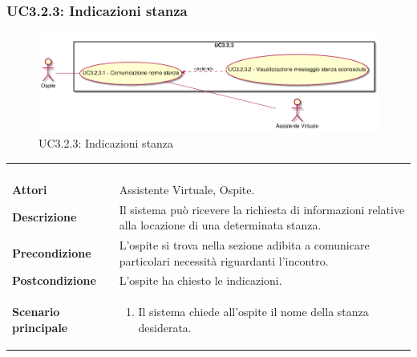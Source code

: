 \newpage\subsubsection{UC3.2.3: Indicazioni stanza}
\label{UC3.2.3}
\begin{figure}[h]
	\centering
	\includegraphics[width=\textwidth,height=\textheight,keepaspectratio]{images/UseCaseUC323.png}
	\caption{UC3.2.3: Indicazioni stanza}
\end{figure}
\begin{longtable}{l|p{10cm}}
	\rowcolor[gray]{0.8} \multicolumn{2}{c}{} \\
	\rowcolor[gray]{0.8} \multicolumn{2}{c}{\textbf{UC3.2.3 - Indicazioni stanza}} \\
	\rowcolor[gray]{0.8} \multicolumn{2}{c}{} \\
	\hline
	&\\
	\textbf{Attori} & Assistente Virtuale, Ospite.\\[7pt]
	\textbf{Descrizione} & Il sistema può ricevere la richiesta di informazioni relative alla locazione di una determinata stanza.\\[7pt]
	\textbf{Precondizione} & L'ospite si trova nella sezione adibita a comunicare particolari necessità riguardanti l'incontro.\\[7pt]
	\textbf{Postcondizione} & L'ospite ha chiesto le indicazioni.\\[7pt]
	\textbf{Scenario principale} &\begin{enumerate}
		\item  Il sistema chiede all'ospite il nome della stanza desiderata.
	\end{enumerate}
	\\[7pt]\hline
\end{longtable}

